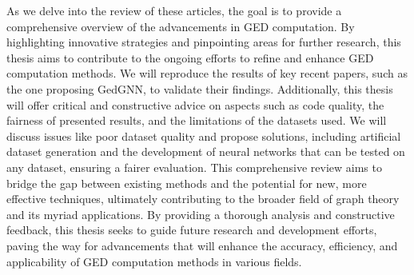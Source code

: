 \documentclass[../Thesis.tex]{subfiles}
\begin{document}
	As we delve into the review of these articles, the goal is to provide a comprehensive overview of the advancements in GED computation. By highlighting innovative strategies and pinpointing areas for further research, this thesis aims to contribute to the ongoing efforts to refine and enhance GED computation methods. We will reproduce the results of key recent papers, such as the one proposing GedGNN, to validate their findings. Additionally, this thesis will offer critical and constructive advice on aspects such as code quality, the fairness of presented results, and the limitations of the datasets used. We will discuss issues like poor dataset quality and propose solutions, including artificial dataset generation and the development of neural networks that can be tested on any dataset, ensuring a fairer evaluation. This comprehensive review aims to bridge the gap between existing methods and the potential for new, more effective techniques, ultimately contributing to the broader field of graph theory and its myriad applications. By providing a thorough analysis and constructive feedback, this thesis seeks to guide future research and development efforts, paving the way for advancements that will enhance the accuracy, efficiency, and applicability of GED computation methods in various fields.
	
	
\end{document}

